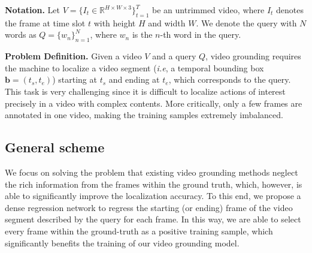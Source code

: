 \documentclass[10pt,twocolumn,letterpaper]{article}
\def\ie{\emph{i.e}\onedot} \def\Ie{\emph{I.e}\onedot}
\begin{document}
	\noindent \textbf{Notation.}
	Let $V=\{I_{t} \in \mathbb{R}^{H\times W\times 3}\}_{t=1}^T$ be an untrimmed video, where $I_{t}$ denotes the frame at time slot $t$ with height $H$ and width $W$.
	We denote the query with $N$ words as $Q=\{w_n\}_{n=1}^{N}$, where $w_n$ is the $n$-th word in the query. 
	
	\noindent \textbf{Problem Definition.}
	Given a video $V$ and a query $Q$, video grounding requires the machine to localize a video segment (\ie, a temporal bounding box $\mathbf{b}=(t_s, t_e)$) starting at $t_s$ and ending at $t_e$, which corresponds to the query.
This task is very challenging since it is difficult to localize actions of interest precisely in a video with complex contents. More critically, only a few frames are annotated in one video, making the training samples extremely imbalanced.
	
	\subsection{General scheme}
	\label{sec:general}
	




We focus on solving the problem that existing video grounding methods neglect the rich information from the frames within the ground truth, which, however, is able to significantly improve the localization accuracy. 
To this end, we propose a dense regression network to regress the starting (or ending) frame of the video segment described by the query for each frame. In this way, we are able to select every frame within the ground-truth as a positive training sample, which significantly benefits the training of our video grounding model.
	
\end{document}

